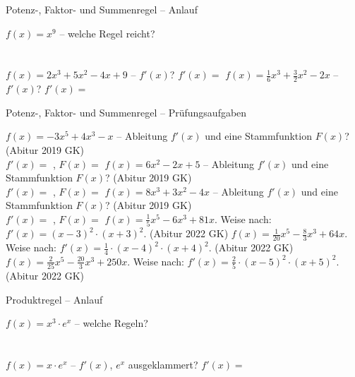 \setcounter{aufgabe}{11}

\begin{aufgabe}{Potenz-, Faktor- und Summenregel – Anlauf}
\begin{teile}
\teil $f(x) = x^9$ – welche Regel reicht? \\  \\  \\ 
\teil $f(x) = 2x^3 + 5x^2 - 4x + 9$ – $f'(x)$? $f'(x) =$ \leerfeld
\teil $f(x) = \frac{1}{6}x^3 + \frac{3}{2}x^2 - 2x$ – $f'(x)$? $f'(x) =$ \leerfeld
\end{teile}
\end{aufgabe}

\begin{aufgabe}{Potenz-, Faktor- und Summenregel – Prüfungsaufgaben}
\begin{teile}
\teil $f(x) = -3x^5 + 4x^3 - x$ – Ableitung $f'(x)$ und eine Stammfunktion $F(x)$? \hfill (Abitur 2019 GK) \\ $f'(x) =$ \leerfeld , $F(x) =$ \leerfeld
\teil $f(x) = 6x^2 - 2x + 5$ – Ableitung $f'(x)$ und eine Stammfunktion $F(x)$? \hfill (Abitur 2019 GK) \\ $f'(x) =$ \leerfeld , $F(x) =$ \leerfeld
\teil $f(x) = 8x^3 + 3x^2 - 4x$ – Ableitung $f'(x)$ und eine Stammfunktion $F(x)$? \hfill (Abitur 2019 GK) \\ $f'(x) =$ \leerfeld , $F(x) =$ \leerfeld
\teil $f(x) = \frac{1}{5}x^5 - 6x^3 + 81x$. Weise nach: $f'(x) = (x - 3)^2 \cdot (x + 3)^2$. \hfill (Abitur 2022 GK)
\teil $f(x) = \frac{1}{20}x^5 - \frac{8}{3}x^3 + 64x$. Weise nach: $f'(x) = \frac{1}{4} \cdot (x - 4)^2 \cdot (x + 4)^2$. \hfill (Abitur 2022 GK)
\teil $f(x) = \frac{2}{25}x^5 - \frac{20}{3}x^3 + 250x$. Weise nach: $f'(x) = \frac{2}{5} \cdot (x - 5)^2 \cdot (x + 5)^2$. \hfill (Abitur 2022 GK)
\end{teile}
\end{aufgabe}

\begin{aufgabe}{Produktregel – Anlauf}
\begin{teile}
\teil $f(x) = x^3 \cdot e^x$ – welche Regeln? \\  \\  \\ 
\teil $f(x) = x \cdot e^x$ – $f'(x)$, $e^x$ ausgeklammert? $f'(x) =$ \leerfeld
\end{teile}
\end{aufgabe}

